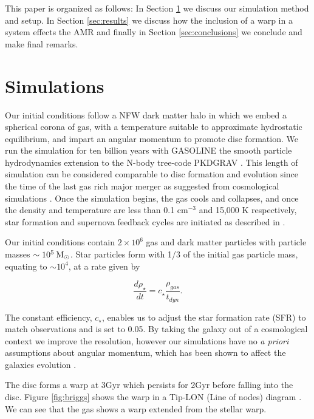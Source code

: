 \documentclass[usenatbib, useAMS,usegraphicx]{mn2e}
\newcommand{\Msun}{\>{\rm M_{\odot}}}
\begin{document}
This paper is organized as follows: In Section \ref{sec:sim} we discuss our simulation method and setup. In Section \ref{sec:results} we discuss how the inclusion of a warp in a system effects the AMR and finally in Section \ref{sec:conclusions} we conclude and make final remarks.

\section{Simulations}\label{sec:sim}

Our initial conditions follow a NFW dark matter halo \citep{navarro1995} in which we embed a spherical corona of gas, with a temperature suitable to approximate hydrostatic equilibrium, and impart an angular momentum to promote disc formation. We run the simulation for ten billion years with GASOLINE \citep{wadsley2004} the smooth particle hydrodynamics extension to the N-body tree-code PKDGRAV \citep{stadel2000a}. This length of simulation can be considered comparable to disc formation and evolution since the time of the last gas rich major merger as suggested from cosmological simulations \citep{Brook2004}. Once the simulation begins, the gas cools and collapses, and once the density and temperature are less than 0.1 cm$^{-3}$ and 15,000 K respectively, star formation and supernova feedback cycles are initiated as described in \cite{stinson2006}.

Our initial conditions contain $2 \times 10^{6}$ gas and dark matter particles with particle masses $\sim 10^{5} \Msun$. Star particles form with 1/3 of the initial gas particle mass, equating to $ \sim 10^{{4}}$, at a rate given by


\begin{equation}
\frac{d \rho_{\star}}{dt} = c_{\star}\frac{\rho_{gas}}{t_{dyn}}.
\end{equation}

The constant efficiency, $c_{\star}$, enables us to adjust the star formation rate (SFR) to match observations \citep{stinson2006} and is set to 0.05. By taking the galaxy out of a cosmological context we improve the resolution, however our simulations have no \emph{a priori} assumptions about angular momentum, which has been shown to affect the galaxies evolution \citep{debattista2006}.

The disc forms a warp at 3Gyr which persists for 2Gyr before falling into the disc. Figure \ref{fig:briggs} shows the warp in a Tip-LON (Line of nodes) diagram \citep{briggs1990}. We can see that the gas shows a warp extended from the stellar warp.
\end{document}
